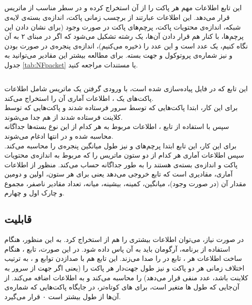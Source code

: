\subsection{}
این تابع اطلاعات مهم هر پاکت را از آن استخراج کرده و در سطر مناسب از ماتریس قرار می‌دهد. این اطلاعات عبارتند از برچسب زمانی پاکت، اندازه‌ی بسته‌ی لایه‌ی شبکه، اندازه‌ی محتویات پاکت، پرچم‌های  پاکت در صورت وجود (برای نشان دادن این پرچم‌ها، با کنار هم قرار دادن آن‌ها، یک رشته تشکیل می‌شود که اگر در مبنای ۲ به آن نگاه کنیم، یک عدد است و این عدد را ذخیره می‌کنیم)، اندازه‌ی پنجره‌ی  در صورت  بودن و نیز شماره‌ی پروتوکول و جهت بسته. برای مطالعه بیشتر این مقادیر می‌توانید به جدول 
\ref{tab:NFpacket}
یا مستندات  مراجعه کنید.
\subsection{}
این تابع که در فایل
پیاده‌سازی شده است، با ورودی گرفتن یک ماتریس شامل اطلاعات پاکت‌های یک ، اطلاعات آماری آن را استخراج می‌کند.\\
برای این کار، ابتدا پاکت‌هایی که توسط سرور فرستاده شدند و پاکت‌هایی که توسط کلاینت فرستاده شدند از هم جدا می‌شوند.\\
سپس با استفاده از تابع
،
اطلاعات مربوط به هر کدام از این نوع بسته‌ها جداگانه محاسبه شده و در انتها ادغام می‌شوند.\\
برای این کار، این تابع ابتدا پرچم‌های  و نیز طول میانگین پنجره‌ی  را محاسبه می‌کند. سپس اطلاعات آماری هر کدام از دو ستون‌ ماتریس را که مربوط به اندازه‌ی محتویات پاکت و اندازه‌ی بسته‌ی  هستند را به طور جداگانه حساب می‌کند. منظور از اطلاعات آماری، مقادیری است که تابع 
خروجی می‌دهد یعنی برای هر ستون، اولین و دومین مقدار آن (در صورت وجود)، میانگین، کمینه، بیشینه، میانه، تعداد مقادیر ناصفر، مجموع و چارک اول و چهارم.\\
\subsection{قابلیت }
در صورت نیاز، می‌توان اطلاعات بیشتری را هم از 
استخراج کرد. به این منظور، هنگام استفاده از برنامه، آرگومان
باید به آن پاس داده شود. در این صورت، تابع 
، 
هنگام ساخت اطلاعات هر 
،
تابع 
در 
را صدا می‌زند. این تابع هم با صدازدن توابع
و
،
به ترتیب اختلاف زمانی هر دو پاکت و نیز طول جهت‌دار هر پاکت را (یعنی اگر جهت از سرور به کلاینت باشد، عدد منفی قرار می‌دهد) را محاسبه می‌کند و به اطلاعات اضافه می‌کند. از آن‌جایی که طول
‌ها
متغیر است، برای ‌های کوتاه‌تر، در جایگاه پاکت‌هایی که شماره‌ی آن‌ها از طول  بیشتر است ۰ قرار می‌گیرد.\\
